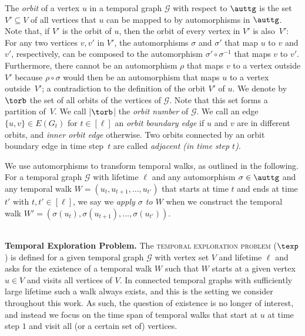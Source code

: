 The \textit{orbit} of a vertex $u$ in a temporal graph $\mathcal{G}$ with
respect to $\auttg$ is the set $V' \subseteq V$ of all vertices that $u$ can be
mapped to by automorphisms in $\auttg$. Note that, if $V'$ is the orbit of $u$,
then the orbit of every vertex in $V'$ is also~$V'$: For any two vertices $v,v'$
in $V'$, the automorphisms $\sigma$ and $\sigma'$ that map $u$ to $v$ and $v'$,
respectively, can be composed to the automorphism $\sigma' \circ \sigma^{-1}$
that maps $v$ to $v'$. Furthermore, there cannot be an automorphism $\rho$ that
maps $v$ to a vertex outside $V'$ because $\rho\circ \sigma$ would then be an
automorphism that maps $u$ to a vertex outside~$V'$; {a contradiction to
the definition of the orbit $V'$ of $u$.}
We denote by $\torb$ the set of all orbits
of the vertices of $\mathcal{G}$. Note that this set forms a partition of~$V$.
We call |$\torb$| the {\em{orbit number}} of $\mathcal{G}$. We call an edge
$\{u, v\} \in E(G_t)$ for $t \in [\ell]$ an \textit{orbit boundary edge} if $u$
and $v$ are in different orbits, and \textit{inner orbit edge} otherwise. Two
orbits connected by an orbit boundary edge {in time step~$t$} are called
{\emph{adjacent (in time step $t$)}.}

We use automorphisms to transform temporal walks, as outlined in the following.
For a temporal graph $\mathcal{G}$ with lifetime $\ell$ and any automorphism
$\sigma \in \auttg$ and any temporal walk $W=(u_t, u_{t+1}, \ldots, u_{t'})$
that starts at time $t$ and ends at time $t'$ with $t, t' \in [\ell]$, we say we
\textit{apply $\sigma$ to $W$} when we construct the temporal walk
$W'=(\sigma(u_t), \sigma(u_{t+1}), \dots, \sigma(u_{t'}))$.



~\\ \noindent \textbf{Temporal Exploration Problem.}
The \textsc{temporal exploration problem} ($\texp$) is defined for a given
temporal graph $\mathcal{G}$ with vertex set $V$ and lifetime $\ell$ and asks
for the existence of a temporal walk $W$ such that $W$ starts at a given vertex
$u \in V$ and visits all vertices of $V$. In connected temporal graphs with
sufficiently large lifetime such a walk always exists, and this is the setting
we consider throughout this work. As such, the question of existence is no
longer of interest, and instead we focus on the time span of temporal walks that
start at $u$ at time step $1$ and visit all (or a certain set of) vertices.


